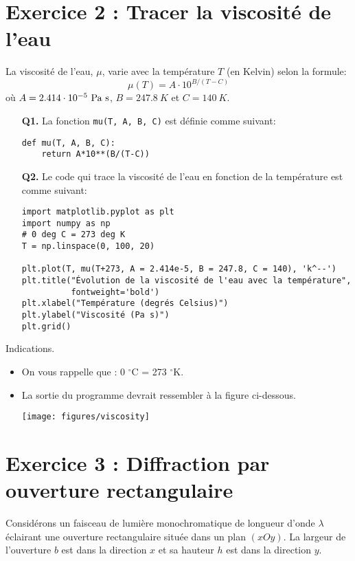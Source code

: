 \documentclass[a4paper,11pt]{article}
\theoremstyle{mytheor}
\begin{document}
\section*{Exercice 2 : Tracer la viscosité de l'eau}
La viscosité de l'eau, $\mu$, varie avec la température $T$ (en Kelvin) selon la formule:
\begin{equation}
\mu (T) = A\cdot 10^{B/(T-C)}
\end{equation}
où $A=2.414\cdot 10^{-5}\hbox{ Pa s}$, $B=247.8 \ K$ et $C = 140 \ K$.


\begin{itemize}
\item[\textbf{Q1.}] La fonction \texttt{mu(T, A, B, C)} est définie comme suivant:
\begin{lstlisting}
def mu(T, A, B, C):
    return A*10**(B/(T-C))
\end{lstlisting}
\newpage
\item[\textbf{Q2.}] Le code qui trace la viscosité de l'eau en fonction de la température est comme suivant:
\begin{lstlisting}
import matplotlib.pyplot as plt
import numpy as np
# 0 deg C = 273 deg K
T = np.linspace(0, 100, 20)

plt.plot(T, mu(T+273, A = 2.414e-5, B = 247.8, C = 140), 'k^--')
plt.title("Évolution de la viscosité de l'eau avec la température",
          fontweight='bold')
plt.xlabel("Température (degrés Celsius)")
plt.ylabel("Viscosité (Pa s)")
plt.grid()
\end{lstlisting}
\end{itemize}

\begin{bclogo}[logo=\bclampe, couleurBarre=green, noborder=true, couleur=yellow!10]{Indications.}
\begin{itemize}
\item On vous rappelle que : 0 $^\circ$C = 273 $^\circ$K.
\item La sortie du programme devrait ressembler à la figure ci-dessous.

\texttt{[image: figures/viscosity]}
\end{itemize}
\end{bclogo}
\section*{Exercice 3 : Diffraction par ouverture rectangulaire}
Considérons un faisceau de lumière monochromatique de longueur d'onde $\lambda$ éclairant une ouverture rectangulaire située dans un plan $(xOy)$. La largeur de l'ouverture $b$ est dans la direction $x$ et sa hauteur $h$ est dans la direction $y$.
\end{document}
